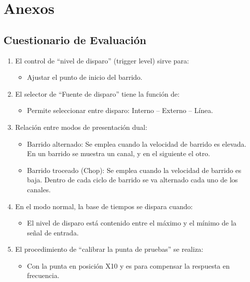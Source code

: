\chapter{Anexos}

\section{Cuestionario de Evaluación}

\begin{enumerate}
    \item El control de ``nivel de disparo'' (trigger level) sirve para:
    \begin{itemize}
        \item[B.] Ajustar el punto de inicio del barrido.
    \end{itemize}

    \item El selector de ``Fuente de disparo'' tiene la función de:
    \begin{itemize}
        \item[C.] Permite seleccionar entre disparo: Interno – Externo – Línea.
    \end{itemize}

    \item Relación entre modos de presentación dual:
    \begin{itemize}
        \item[A.] Barrido alternado: Se emplea cuando la velocidad de barrido es elevada. En un barrido se muestra un
            canal, y en el siguiente el otro.
        \item[B.] Barrido troceado (Chop): Se emplea cuando la velocidad de barrido es baja. Dentro de cada ciclo de
            barrido se va alternado cada uno de los canales.
    \end{itemize}

    \item En el modo normal, la base de tiempos se dispara cuando:
    \begin{itemize}
        \item[B.] El nivel de disparo está contenido entre el máximo y el mínimo de la señal de entrada.
    \end{itemize}

    \item El procedimiento de ``calibrar la punta de pruebas'' se realiza:
    \begin{itemize}
        \item[B.] Con la punta en posición X10 y es para compensar la respuesta en frecuencia.
    \end{itemize}


\end{enumerate}
